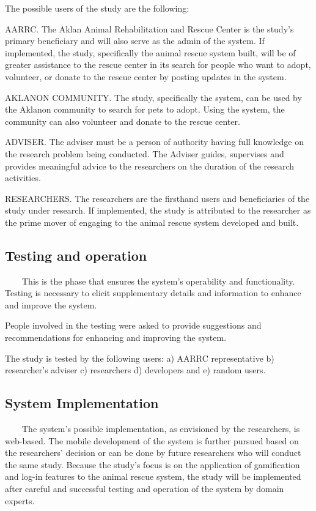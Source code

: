 The possible users of the study are the following:

AARRC. The Aklan Animal Rehabilitation and Rescue Center is the study's primary beneficiary and will also serve as the admin of the system. If implemented, the study, specifically the animal rescue system built, will be of greater assistance to the rescue center in its search for people who want to adopt, volunteer, or donate to the rescue center by posting updates in the system.

AKLANON COMMUNITY. The study, specifically the system, can be used by the Aklanon community to search for pets to adopt. Using the system, the community can also volunteer and donate to the rescue center.

ADVISER. The adviser must be a person of authority having full knowledge on the research problem being conducted. The Adviser guides, supervises and provides meaningful advice to the researchers on the duration of the research activities.

RESEARCHERS. The researchers are the firsthand users and beneficiaries of the study under research. If implemented, the study is attributed to the researcher as the prime mover of engaging to the animal rescue system developed and built. 

\subsection{Testing and operation}

~~~~This is the phase that ensures the system's operability and functionality. Testing is necessary to elicit supplementary details and information to enhance and improve the system. 

People involved in the testing were asked to provide suggestions and recommendations for enhancing and improving the system.

The study is tested by the following users: a) AARRC representative b) researcher’s adviser c) researchers d) developers and e) random users.

\subsection{System Implementation}

~~~~The system's possible implementation, as envisioned by the researchers, is web-based. The mobile development of the system is further pursued based on the researchers' decision or can be done by future researchers who will conduct the same study. Because the study's focus is on the application of gamification and log-in features to the animal rescue system, the study will be implemented after careful and successful testing and operation of the system by domain experts.

